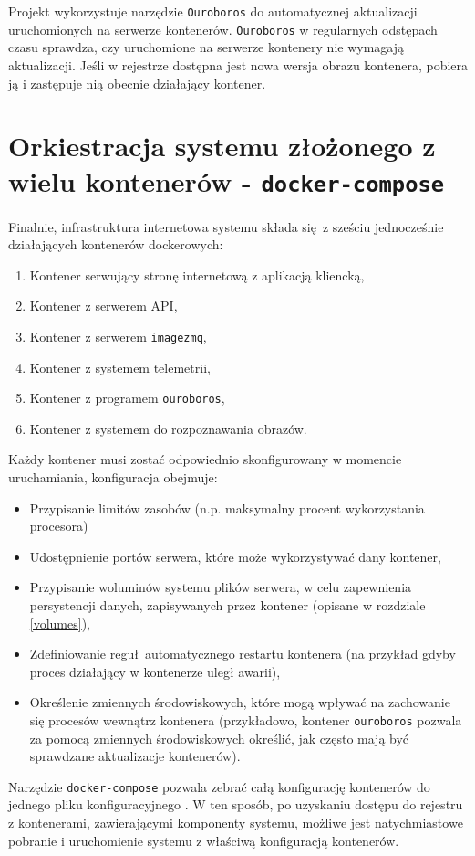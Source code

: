 Projekt wykorzystuje narzędzie \texttt{Ouroboros} do automatycznej aktualizacji
uruchomionych na serwerze kontenerów. \texttt{Ouroboros} w regularnych odstępach
czasu sprawdza, czy uruchomione na serwerze kontenery nie wymagają aktualizacji.
Jeśli w rejestrze dostępna jest nowa wersja obrazu kontenera, pobiera ją i zastępuje
nią obecnie działający kontener.

\section{Orkiestracja systemu złożonego z wielu kontenerów - \texttt{docker-compose}}

Finalnie, infrastruktura internetowa systemu składa się z sześciu
jednocześnie działających kontenerów dockerowych:

\begin{enumerate}
  \item Kontener serwujący stronę internetową z aplikacją kliencką,
  \item Kontener z serwerem API,
  \item Kontener z serwerem \texttt{imagezmq},
  \item Kontener z systemem telemetrii,
  \item Kontener z programem \texttt{ouroboros},
  \item Kontener z systemem do rozpoznawania obrazów. 
\end{enumerate}

\noindent
Każdy kontener musi zostać odpowiednio skonfigurowany w momencie uruchamiania,
konfiguracja obejmuje:

\begin{itemize}
  \item Przypisanie limitów zasobów (n.p. maksymalny procent wykorzystania procesora)
  \item Udostępnienie portów serwera, które może wykorzystywać dany kontener,
  \item Przypisanie woluminów systemu plików serwera, w celu zapewnienia persystencji
        danych, zapisywanych przez kontener (opisane w rozdziale \ref{volumes}),
  \item Zdefiniowanie reguł automatycznego restartu kontenera (na przykład gdyby proces
        działający w kontenerze uległ awarii),
  \item Określenie zmiennych środowiskowych, które mogą wpływać na zachowanie się
        procesów wewnątrz kontenera (przykładowo, kontener \texttt{ouroboros} pozwala
        za pomocą zmiennych środowiskowych określić, jak często mają być sprawdzane
        aktualizacje kontenerów).
\end{itemize}

Narzędzie \texttt{docker-compose} pozwala zebrać całą konfigurację kontenerów do 
jednego pliku konfiguracyjnego \cite{docker_compose}. W ten sposób, po uzyskaniu
dostępu do rejestru z kontenerami, zawierającymi komponenty systemu, możliwe jest
natychmiastowe pobranie i uruchomienie systemu z właściwą konfiguracją kontenerów.
